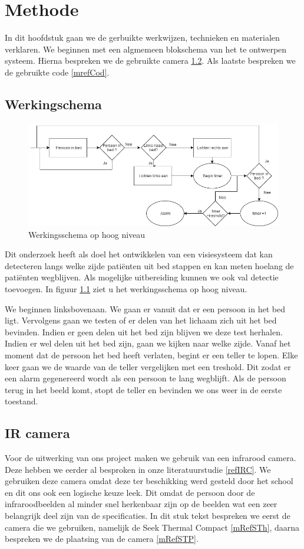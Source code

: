 \chapter{Methode}
In dit hoofdstuk gaan we de gerbuikte werkwijzen, technieken en materialen verklaren. We beginnen met een algmemeen blokschema van het te ontwerpen systeem. Hierna bespreken we de gebruikte camera \ref{MRefIRC}. Als laatste bespreken we de gebruikte code \ref{mrefCod}.

\section{Werkingschema}
\begin{figure}[h]
	\includegraphics[scale=0.5]{HoogNiveauBlokDiagram}
	\caption{Werkingsschema op hoog niveau}
	\label{imgWeS}
\end{figure}
Dit onderzoek heeft als doel het ontwikkelen van een visiesysteem dat kan detecteren langs welke zijde pati\"enten uit bed stappen en kan meten hoelang de pati\"enten wegblijven. Als mogelijke uitbereiding kunnen we ook val detectie toevoegen. In figuur \ref{imgWeS} ziet u het werkingsschema op hoog niveau.

We beginnen linksbovenaan. We gaan er vanuit dat er een persoon in het bed ligt. Vervolgens gaan we testen of er delen van het lichaam zich uit het bed bevinden. Indien er geen delen uit het bed zijn blijven we deze test herhalen. Indien er wel delen uit het bed zijn, gaan we kijken naar welke zijde. Vanaf het moment dat de persoon het bed heeft verlaten, begint er een teller te lopen. Elke keer gaan we de waarde van de teller vergelijken met een treshold. Dit zodat er een alarm gegenereerd wordt als een persoon te lang wegblijft. Als de persoon terug in het beeld komt, stopt de teller en bevinden we ons weer in de eerste toestand. 

\section{IR camera}
\label{MRefIRC}
Voor de uitwerking van ons project maken we gebruik van een infrarood camera. Deze hebben we eerder al besproken in onze literatuurstudie \ref{refIRC}. We gebruiken deze camera omdat deze ter beschikking werd gesteld door het school en dit ons ook een logische keuze leek. Dit omdat de persoon door de infraroodbeelden al minder snel herkenbaar zijn op de beelden wat een zeer belangrijk deel zijn van de specificaties. In dit stuk tekst bespreken we eerst de camera die we gebruiken, namelijk de Seek Thermal Compact \ref{mRefSTh}, daarna bespreken we de plaatsing van de camera \ref{mRefSTP}.

